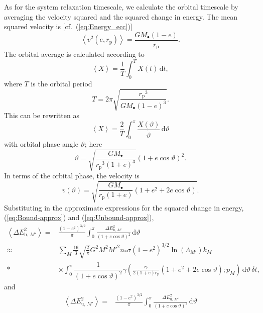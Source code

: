 \documentclass[useAMS,usedcolumn,usegraphicx,usenatbib]{mn2e}
\newcommand{\eqnref}[1]{(\ref{eq:#1})}
\newcommand{\sub}[1]{\ensuremath{_\mathrm{#1}}}
\newcommand{\dd}{\ensuremath{\mathrm{d}}}
\newcommand{\intd}[4]{\ensuremath{\displaystyle \int_{#1}^{#2}{#3}\,\dd{#4}}}
\newcommand{\recip}[1]{\ensuremath{\dfrac{1}{#1}}}
\begin{document}
\begin{onecolumn}
As for the system relaxation timescale, we calculate the orbital timescale by averaging the velocity squared and the squared change in energy. The mean squared velocity is [cf.\ \eqnref{Energy_ecc}]
\begin{equation}
\left\langle v^2\left(e,r\sub{p}\right)\right\rangle = \frac{GM_\bullet(1 - e)}{r\sub{p}}.
\end{equation}
The orbital average is calculated according to~\citep[section 2.2b]{Spitzer1987}
\begin{equation}
\left\langle X\right\rangle = \recip{T}\intd{0}{T}{X(t)}{t},
\end{equation}
where $T$ is the orbital period
\begin{equation}
T = 2\pi\sqrt{\frac{r\sub{p}^3}{GM_\bullet(1-e)^{3}}}.
\end{equation}
 This can be rewritten as
\begin{equation}
\left\langle X\right\rangle = \frac{2}{T}\intd{0}{\pi}{\frac{X(\vartheta)}{\dot{\vartheta}}}{\vartheta}
\end{equation}
with orbital phase angle $\vartheta$; here
\begin{equation}
\dot{\vartheta} = \sqrt{\frac{GM_\bullet}{r\sub{p}^3(1+e)^3}}(1 + e \cos\vartheta)^2.
\end{equation}
In terms of the orbital phase, the velocity is
\begin{equation}
v(\vartheta) = \sqrt{\frac{GM_\bullet}{r\sub{p}(1+e)}\left(1 + e^2 + 2e\cos\vartheta\right)}.
\end{equation}
Substituting in the approximate expressions for the squared change in energy, \eqnref{Bound-approx} and \eqnref{Unbound-approx},
\begin{align}
\left\langle\Delta E^2_{\mathrm{b},\,M'}\right\rangle = {} & \frac{\left(1-e^2\right)^{3/2}}{\pi}\intd{0}{\pi}{\frac{\Delta E^2_{\mathrm{b},\,M'}}{(1 + e \cos\vartheta)^2}}{\vartheta} \\
 \approx {} & \sum_M \frac{16}{3}\sqrt{\frac{2}{\pi}}G^2 M^2{M'}^2n_\ast\sigma\left(1-e^2\right)^{3/2}\ln\left(\Lambda_{M'}\right)k_M \nonumber \\*
 & \times {} \intd{0}{\pi}{\recip{(1 + e \cos\vartheta)^2} \gamma\left(\frac{r\sub{c}}{2(1+e)r\sub{p}}\left(1+e^2+2e\cos\vartheta\right);p_M\right)}{\vartheta}\,\delta t,
\end{align}
and
\begin{align}
\left\langle\Delta E^2_{\mathrm{u},\,M'}\right\rangle = {} & \frac{\left(1-e^2\right)^{3/2}}{\pi}\intd{0}{\pi}{\frac{\Delta E^2_{\mathrm{u},\,M'}}{(1 + e \cos\vartheta)^2}}{\vartheta} \\

\end{align}
\end{onecolumn}
\end{document}
